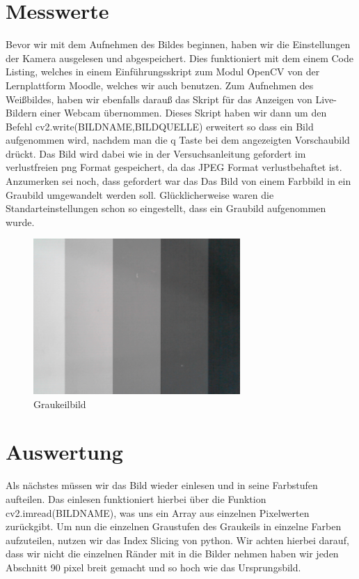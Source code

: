 \documentclass[TGAI_Laborbericht.tex]{subfiles}
\begin{document}
\section{Messwerte}
\label{chap:VERSUCH_1_MESSWERTE}

Bevor wir mit dem Aufnehmen des Bildes beginnen, haben wir die Einstellungen der Kamera ausgelesen und abgespeichert. Dies funktioniert mit dem einem Code Listing, welches in einem Einführungsskript zum Modul OpenCV von der Lernplattform Moodle, welches wir auch benutzen. Zum Aufnehmen des Weißbildes, haben wir ebenfalls darauß das Skript für das Anzeigen von Live-Bildern einer Webcam übernommen. Dieses Skript haben wir dann um den Befehl cv2.write(BILDNAME,BILDQUELLE) erweitert so dass ein Bild aufgenommen wird, nachdem man die q Taste bei dem angezeigten Vorschaubild drückt. Das Bild wird dabei wie in der Versuchsanleitung gefordert im verlustfreien png Format gespeichert, da das JPEG Format verlustbehaftet ist. Anzumerken sei noch, dass gefordert war das Das Bild von einem Farbbild in ein Graubild umgewandelt werden soll. Glücklicherweise waren die Standarteinstellungen schon so eingestellt, dass ein Graubild aufgenommen wurde.

\begin{figure}[H]
	\includegraphics[width=0.7\textwidth]{media/graubild.png}
	\caption{Graukeilbild}
	\label{fig:Graukeilbild}
\end{figure}

\section{Auswertung}
\label{chap:VERSUCH_1_AUSWERTUNG}

Als nächstes müssen wir das Bild wieder einlesen und in seine Farbstufen aufteilen. Das einlesen funktioniert hierbei über die Funktion  cv2.imread(BILDNAME), was uns ein Array aus einzelnen Pixelwerten zurückgibt. Um nun die einzelnen Graustufen des Graukeils in einzelne Farben aufzuteilen, nutzen wir das Index Slicing von python. Wir achten hierbei darauf, dass wir nicht die einzelnen Ränder mit in die Bilder nehmen haben wir jeden Abschnitt 90 pixel breit gemacht und so hoch wie das Ursprungsbild.
\end{document}
